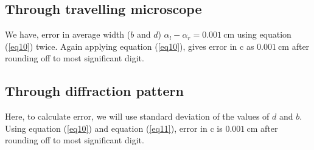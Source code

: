 \documentclass{article}
\begin{document}
    \subsection{Through travelling microscope}
    We have, error in average width ($b$ and $d$) $\alpha_l - \alpha_r = \SI{0.001}{\centi \metre}$ using equation (\ref{eq10}) twice.
    Again applying equation (\ref{eq10}), gives error in c as $\SI{0.001}{\centi \metre}$ after rounding off to most significant digit.
    \subsection{Through diffraction pattern}
    Here, to calculate error, we will use standard deviation of the values of $d$ and $b$. Using equation (\ref{eq10}) and equation (\ref{eq11}), error in c is $\SI{0.001}{\centi \metre}$ after rounding off to most significant digit.
    
    
    
\end{document}
